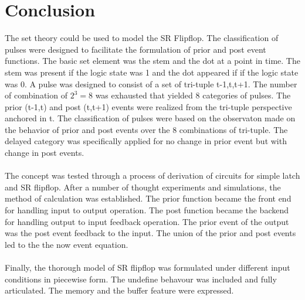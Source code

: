 \documentclass[10pt,journal]{IEEEtran}
\begin{document}
\section{Conclusion}
The set theory could be used to model the SR Flipflop. The classification of     pulses were designed to facilitate the formulation of prior and post event     functions. The basic set element was the stem and the dot at a point in time.     The stem was present if the logic state was 1 and the dot appeared if if the     logic state was 0.  A pulse was designed to consist of a set of tri-tuple     {t-1,t,t+1}. The number of combination of $2^3=8$ was exhausted that yielded     8 categories of pulses. The prior (t-1,t) and post (t,t+1) events were     realized from the tri-tuple perspective anchored in t. The classification of     pulses were based on the observaton made on the behavior of prior and post     events over the 8 combinations of tri-tuple. The delayed category was     specifically applied for no change in prior event but with change in post     events.\\ \ \\     The concept was tested through a process of derivation of circuits for     simple latch and SR flipflop. After a number of thought experiments and     simulations, the method of calculation was established. The prior function     became the front end for handling input to output operation. The post function     became the backend for handling output to input feedback operation.      The prior event of the output was the post event feedback to the input.     The union of the prior and post events led to the the now event equation.     \\ \ \\     Finally, the thorough model of SR flipflop was formulated under different     input conditions in piecewise form. The undefine behavour was included and     fully articulated. The memory and the buffer feature were expressed. \\ \ \\     
\end{document}
